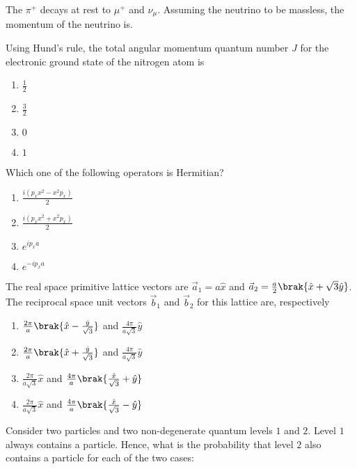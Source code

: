 \item The $\pi^+$ decays at rest to $\mu^+$ and $\nu_{\mu}$. Assuming the neutrino to be massless, the momentum of the neutrino is. 

\item Using Hund's rule, the total angular momentum quantum number $J$ for the electronic ground state of the nitrogen atom is

\begin{enumerate}
    \item $\frac{1}{2}$
    \item $\frac{3}{2}$
    \item $0$
    \item $1$
\end{enumerate}

\item Which one of the following operators is Hermitian?

\begin{enumerate}
    \item $\frac{i(p_x x^2 - x^2 p_x)}{2}$
    \item $\frac{i(p_x x^2 + x^2 p_x)}{2}$
    \item $e^{ip_x a}$
    \item $e^{-ip_x a}$
\end{enumerate}

\item The real space primitive lattice vectors are $\vec{a}_1 = a\hat{x}$ and $\vec{a}_2 = \frac{a}{2}\brak{\hat{x} + \sqrt{3}\hat{y}}$. The reciprocal space unit vectors $\vec{b}_1$ and $\vec{b}_2$ for this lattice are, respectively  

\begin{enumerate}
    \item $\frac{2\pi}{a}\brak{\hat{x} - \frac{\hat{y}}{\sqrt{3}}}$ and $\frac{4\pi}{a\sqrt{3}}\hat{y}$
    \item $\frac{2\pi}{a}\brak{\hat{x} + \frac{\hat{y}}{\sqrt{3}}}$ and $\frac{4\pi}{a\sqrt{3}}\hat{y}$
    \item $\frac{2\pi}{a\sqrt{3}}\hat{x}$ and $\frac{4\pi}{a}\brak{\frac{\hat{x}}{\sqrt{3}} + \hat{y}}$
    \item $\frac{2\pi}{a\sqrt{3}}\hat{x}$ and $\frac{4\pi}{a}\brak{\frac{\hat{x}}{\sqrt{3}} - \hat{y}}$
\end{enumerate}

\item Consider two particles and two non-degenerate quantum levels $1$ and $2$. Level $1$ always contains a particle. Hence, what is the probability that level $2$ also contains a particle for each of the two cases:

